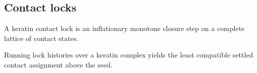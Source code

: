 \subsection{Contact locks}

\begin{proposition}\label{thm:keratin-lock}\leanok{}
A keratin contact lock is an inflationary monotone closure step on a complete
lattice of contact states.
\end{proposition}

\begin{theorem}\label{thm:keratin-settle-lock}\leanok{}
Running lock histories over a keratin complex yields the least compatible
settled contact assignment above the seed.
\end{theorem}
